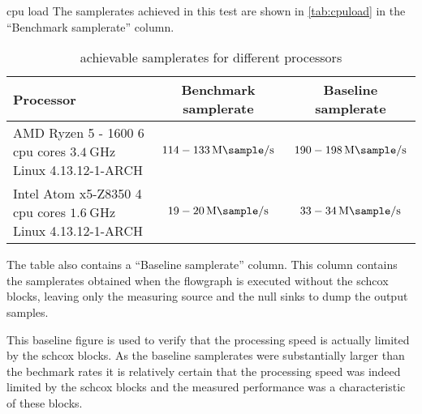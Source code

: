 \begin{subchapter}{\Acrshort{cpu} load}
  The samplerates achieved in this test are shown
  in \autoref{tab:cpuload} in the ``Benchmark samplerate''
  column.

  \begin{table}[H]
    \centering
    \begin{tabular}{| l | c | c |}
      \hline
      Processor & Benchmark samplerate & Baseline samplerate \\

      \hline
      \parbox[c]{5cm}{\vspace{1mm} AMD Ryzen 5 - 1600 \\ 6 \acrshort{cpu} cores \\ $\SI{3.4}{\giga\hertz}$ \\ Linux 4.13.12-1-ARCH \vspace{1mm}} &
      \parbox[c]{5cm}{\centering $114 - \SI{133}{\mega\sample\per\second}$} &
      \parbox[c]{5cm}{\centering $190 - \SI{198}{\mega\sample\per\second}$} \\

      \hline
      \parbox[c]{5cm}{\vspace{1mm} Intel Atom x5-Z8350 \\ 4 \acrshort{cpu} cores \\ $\SI{1.6}{\giga\hertz}$ \\ Linux 4.13.12-1-ARCH \vspace{1mm}} &
      \parbox[c]{5cm}{\centering $19 - \SI{20}{\mega\sample\per\second}$} &
      \parbox[c]{5cm}{\centering $33 - \SI{34}{\mega\sample\per\second}$} \\

      \hline
    \end{tabular}
    \caption{achievable samplerates for different processors}
    \label{tab:cpuload}
  \end{table}

  The table also contains a ``Baseline samplerate'' column.
  This column contains the samplerates obtained when the flowgraph
  is executed without the \gls{schcox} blocks, leaving only
  the measuring source and the null sinks to dump the
  output samples.

  This baseline figure is used to verify that the
  processing speed is actually limited by the \gls{schcox} blocks.
  As the baseline samplerates were substantially larger
  than the bechmark rates it is relatively certain that
  the processing speed was indeed limited by the \gls{schcox} blocks
  and the measured performance was a characteristic of these blocks. \\


\end{subchapter}
